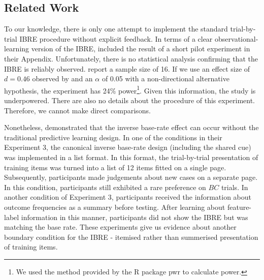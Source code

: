 \documentclass[10pt,letterpaper]{article}
\begin{document}
\subsection{Related Work}

To our knowledge, there is only one attempt to implement the standard trial-by-trial IBRE procedure without explicit feedback.
In terms of a clear observational-learning version of the IBRE,  included the result of a short pilot experiment in their Appendix.
Unfortunately, there is no statistical analysis confirming that the IBRE is reliably observed.
 report a sample size of 16.
If we use an effect size of $d = 0.46$ observed by  and an $\alpha$ of 0.05 with a non-directional alternative hypothesis, the experiment has 24\% power\footnote{We used the method provided by the R package pwr \cite{champely2020pwr} to calculate power.}.
Given this information, the study is underpowered.
There are also no details about the procedure of this experiment.
Therefore, we cannot make direct comparisons.

Nonetheless,  demonstrated that the inverse base-rate effect can occur without the traditional predictive learning design.
In one of the conditions in their Experiment 3, the canonical inverse base-rate design (including the shared cue) was implemented in a list format.
In this format, the trial-by-trial presentation of training items was turned into a list of 12 items fitted on a single page.
Subsequently, participants made judgements about new cases on a separate page.
In this condition, participants still exhibited a rare preference on $BC$ trials.
In another condition of Experiment 3, participants received the information about outcome frequencies as a summary before testing.
After learning about feature-label information in this manner, participants did not show the IBRE but was matching the base rate.
These experiments give us evidence about another boundary condition for the IBRE - itemised rather than summerised presentation of training items.
\end{document}
